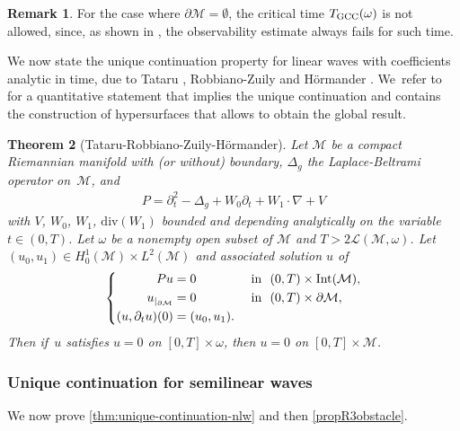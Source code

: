 \documentclass[JEP,XML,SOM,Unicode,published]{cedram}
\newtheorem{theorem}{Theorem}[section]
\theoremstyle{definition}
\newtheorem{remark}[theorem]{Remark}
\let\mc\mathcal
\newcommand{\M}{\mc{M}}
\providecommand{\Int}[1]{\textup{Int}(#1)}
\begin{document}
\begin{remark}
For the case where $\partial\M=\emptyset$, the critical time $T_{\textup{GCC}}(\omega)$ is not allowed, since, as shown in \cite[Th.\,1.1]{LL16}, the observability estimate always fails for such time.
\end{remark}

We now state the unique continuation property for linear waves with coefficients analytic in time, due to Tataru \cite{Tat95,Tat99}, Robbiano-Zuily \cite{RZ:98} and Hörmander \cite{Hor:97}. We~refer to \cite[Th.\,6.1]{LL19} for a quantitative statement that implies the unique continuation and contains the construction of hypersurfaces that allows to obtain the global result.

\begin{theorem}[Tataru-Robbiano-Zuily-Hörmander]\label{thm:qucp}
Let $\M$ be a compact Riemannian manifold with (or without) boundary, $\Delta_g$ the Laplace-Beltrami operator on~$\M$, and
\begin{align*}
P=\partial_t^2-\Delta_g+W_0\partial_t+W_1\cdot\nabla+V
\end{align*}
with $V$, $W_0$, $W_1$, $\text{div}(W_1)$ bounded and depending analytically on the variable $t\in (0, T)$. Let $\omega$ be a nonempty open subset of $\M$ and $T>2\mc{L}(\M, \omega)$. Let $(u_0, u_1)\in H_0^1(\M)\times L^2(\M)$ and associated solution $u$ of
\begin{align*}
\left\{\begin{aligned}
Pu&=0&&\text{ in }\ (0, T)\times\Int{\M},\\
u_{|_{\partial\M}}&=0 &&\text{ in }\ (0, T)\times \partial\M,\\
(u, \partial_t u)(0)&=(u_0, u_1). &
\end{aligned} \right.
\end{align*}
Then if~$u$ satisfies $u=0$ on $[0,T]\times \omega$, then $u=0$ on $[0,T]\times \M$.
\end{theorem}

\subsubsection{Unique continuation for semilinear waves} We now prove \cref{thm:unique-continuation-nlw} and then \cref{propR3obstacle}.
\end{document}
